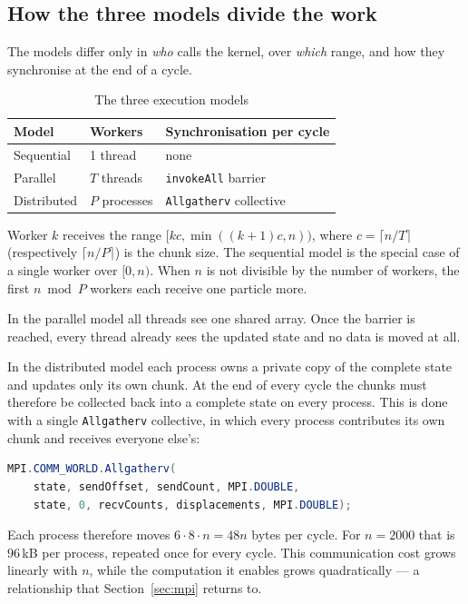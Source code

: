 \documentclass[sigconf]{acmart}
\begin{document}
\subsection{How the three models divide the work}

The models differ only in \emph{who} calls the kernel, over \emph{which} range, and how they
synchronise at the end of a cycle.

\begin{table}[h]
\centering
\caption{The three execution models}
\small
\begin{tabular}{@{}lll@{}}
\toprule
Model & Workers & Synchronisation per cycle \\
\midrule
Sequential  & 1 thread      & none \\
Parallel    & $T$ threads   & \texttt{invokeAll} barrier \\
Distributed & $P$ processes & \texttt{Allgatherv} collective \\
\bottomrule
\end{tabular}
\end{table}

Worker $k$ receives the range $[k c, \min((k{+}1)c, n))$, where $c = \lceil n/T \rceil$
(respectively $\lceil n/P \rceil$) is the chunk size. The sequential model is the special case of a
single worker over $[0, n)$. When $n$ is not divisible by the number of workers, the first
$n \bmod P$ workers each receive one particle more.

In the parallel model all threads see one shared array. Once the barrier is reached, every thread
already sees the updated state and no data is moved at all.

In the distributed model each process owns a private copy of the complete state and updates only its
own chunk. At the end of every cycle the chunks must therefore be collected back into a complete
state on every process. This is done with a single \texttt{Allgatherv} collective, in which every
process contributes its own chunk and receives everyone else's:

\begin{lstlisting}[language=Java]
MPI.COMM_WORLD.Allgatherv(
    state, sendOffset, sendCount, MPI.DOUBLE,
    state, 0, recvCounts, displacements, MPI.DOUBLE);
\end{lstlisting}

Each process therefore moves $6 \cdot 8 \cdot n = 48n$ bytes per cycle. For $n = 2000$ that is
$96$\,kB per process, repeated once for every cycle. This communication cost grows linearly with $n$,
while the computation it enables grows quadratically --- a relationship that
Section~\ref{sec:mpi} returns to.
\end{document}
